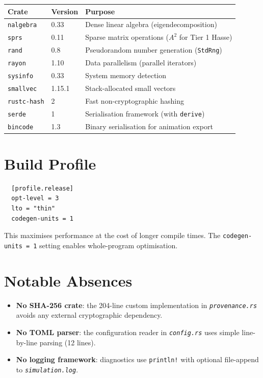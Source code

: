 \documentclass[11pt, a4paper, openany]{book}
\newcommand{\code}[1]{\texttt{#1}}
\newcommand{\file}[1]{\texttt{\itshape #1}}
\begin{document}
\begin{longtable}{llp{8cm}}
  \toprule
  \textbf{Crate} & \textbf{Version} & \textbf{Purpose} \\
  \midrule
  \code{nalgebra}    & 0.33   & Dense linear algebra (eigendecomposition) \\
  \code{sprs}        & 0.11   & Sparse matrix operations ($A^2$ for Tier 1 Hasse) \\
  \code{rand}        & 0.8    & Pseudorandom number generation (\code{StdRng}) \\
  \code{rayon}       & 1.10   & Data parallelism (parallel iterators) \\
  \code{sysinfo}     & 0.33   & System memory detection \\
  \code{smallvec}    & 1.15.1 & Stack-allocated small vectors \\
  \code{rustc-hash}  & 2      & Fast non-cryptographic hashing \\
  \code{serde}       & 1      & Serialisation framework (with \code{derive}) \\
  \code{bincode}     & 1.3    & Binary serialisation for animation export \\
  \bottomrule
\end{longtable}

\section{Build Profile}

\begin{verbatim}
  [profile.release]
  opt-level = 3
  lto = "thin"
  codegen-units = 1
\end{verbatim}

This maximises performance at the cost of longer compile times.  The
\code{codegen-units = 1} setting enables whole-program optimisation.

\section{Notable Absences}

\begin{itemize}
  \item \textbf{No SHA-256 crate}: the 204-line custom implementation in
        \file{provenance.rs} avoids any external cryptographic dependency.
  \item \textbf{No TOML parser}: the configuration reader in \file{config.rs}
        uses simple line-by-line parsing (12 lines).
  \item \textbf{No logging framework}: diagnostics use \code{println!} with
        optional file-append to \file{simulation.log}.
\end{itemize}
\end{document}
